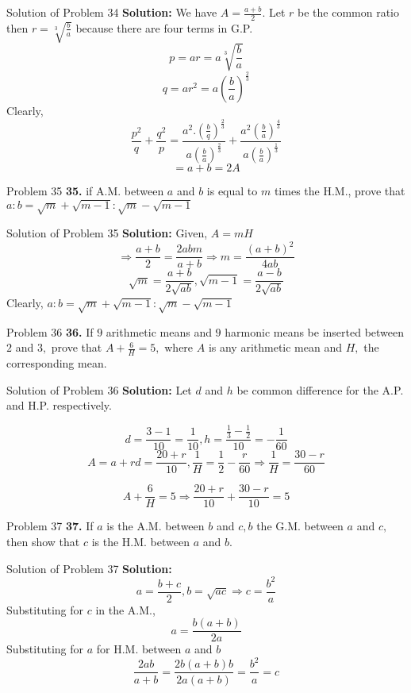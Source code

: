 \documentclass[aspectratio=1610,8pt]{beamer}
\begin{document}
\begin{frame}{Solution of Problem 34}
  \textbf{Solution:} We have $A = \frac{a + b}{2}.$ Let $r$ be the common ratio
  then $r = \sqrt[3]{\frac{b}{a}}$ because there are four terms in G.P.
  $$p = ar = a\sqrt[3]{\frac{b}{a}}$$
  $$q = ar^2 = a\left(\frac{b}{a}\right)^\frac{2}{3}$$
  Clearly, $$\frac{p^2}{q} + \frac{q^2}{p} =
  \frac{a^2.\left(\frac{b}{q}\right)^\frac{2}{3}}{a\left(\frac{b}{a}\right)^\frac{2}{3}}
  +
  \frac{a^2\left(\frac{b}{a}\right)^\frac{4}{3}}{a\left(\frac{b}{a}\right)^\frac{1}{3}}$$
  $$= a + b = 2A$$
\end{frame}
\begin{frame}{Problem 35}
  \textbf{35.} if A.M. between $a$ and $b$ is equal to $m$ times the H.M.,
  prove that $a:b = \sqrt{m} + \sqrt{m- 1}: \sqrt{m} - \sqrt{m - 1}$
\end{frame}
\begin{frame}{Solution of Problem 35}
  \textbf{Solution:} Given, $A = mH$
  $$\Rightarrow \frac{a + b}{2} = \frac{2abm}{a + b}\Rightarrow m = \frac{(a +
    b)^2}{4ab}$$
  $$\sqrt{m} = \frac{a + b}{2\sqrt{ab}}, \sqrt{m - 1} = \frac{a -
    b}{2\sqrt{ab}}$$
  Clearly, $a:b = \sqrt{m} + \sqrt{m- 1}: \sqrt{m} - \sqrt{m - 1}$
\end{frame}
\begin{frame}{Problem 36}
  \textbf{36.} If $9$ arithmetic means and $9$ harmonic means be inserted
  between $2$ and $3,$ prove that $A + \frac{6}{H} = 5,$ where $A$ is any
  arithmetic mean and $H,$ the corresponding mean.
\end{frame}
\begin{frame}{Solution of Problem 36}
  \textbf{Solution:} Let $d$ and $h$ be common difference for the A.P. and
  H.P. respectively.

  $$d = \frac{3 - 1}{10} = \frac{1}{10}, h = \frac{\frac{1}{3} -
    \frac{1}{2}}{10} = -\frac{1}{60}$$
  $$A = a + rd = \frac{20 + r}{10}, \frac{1}{H} = \frac{1}{2} - \frac{r}{60}
  \Rightarrow \frac{1}{H} = \frac{30 - r}{60}$$

  $$A + \frac{6}{H} = 5 \Rightarrow \frac{20 + r}{10} + \frac{30 - r}{10} = 5$$
\end{frame}
\begin{frame}{Problem 37}
  \textbf{37.} If $a$ is the A.M. between $b$ and $c, b$ the G.M. between $a$
  and $c,$ then show that $c$ is the H.M. between $a$ and $b.$
\end{frame}
\begin{frame}{Solution of Problem 37}
  \textbf{Solution:} $$a = \frac{b + c}{2}, b = \sqrt{ac} \Rightarrow c =
  \frac{b^2}{a}$$
  Substituting for $c$ in the A.M.,
  $$a = \frac{b(a + b)}{2a}$$
  Substituting for $a$ for H.M. between $a$ and $b$
  $$\frac{2ab}{a + b} = \frac{2b(a + b)b}{2a(a + b)} = \frac{b^2}{a} = c$$
\end{frame}
\end{document}
